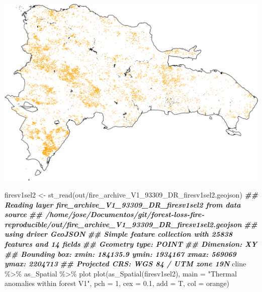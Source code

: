 \documentclass[10pt,landscape,a3paper]{article}
\newenvironment{Shaded}{\begin{snugshade}}{\end{snugshade}}
\newcommand{\AttributeTok}[1]{\textcolor[rgb]{0.77,0.63,0.00}{#1}}
\newcommand{\DecValTok}[1]{\textcolor[rgb]{0.00,0.00,0.81}{#1}}
\newcommand{\DocumentationTok}[1]{\textcolor[rgb]{0.56,0.35,0.01}{\textbf{\textit{#1}}}}
\newcommand{\FloatTok}[1]{\textcolor[rgb]{0.00,0.00,0.81}{#1}}
\newcommand{\FunctionTok}[1]{\textcolor[rgb]{0.00,0.00,0.00}{#1}}
\newcommand{\NormalTok}[1]{#1}
\newcommand{\OtherTok}[1]{\textcolor[rgb]{0.56,0.35,0.01}{#1}}
\newcommand{\SpecialCharTok}[1]{\textcolor[rgb]{0.00,0.00,0.00}{#1}}
\newcommand{\StringTok}[1]{\textcolor[rgb]{0.31,0.60,0.02}{#1}}
\begin{document}
\begin{center}\includegraphics{img/data-download-preparation-eda/fires-m6-v1-sel2-1} \end{center}

\begin{Shaded}
\begin{Highlighting}[]
\NormalTok{firesv1sel2 }\OtherTok{\textless{}{-}} \FunctionTok{st\_read}\NormalTok{(}\StringTok{\textquotesingle{}out/fire\_archive\_V1\_93309\_DR\_firesv1sel2.geojson\textquotesingle{}}\NormalTok{)}
\DocumentationTok{\#\# Reading layer \textasciigrave{}fire\_archive\_V1\_93309\_DR\_firesv1sel2\textquotesingle{} from data source }
\DocumentationTok{\#\#   \textasciigrave{}/home/jose/Documentos/git/forest{-}loss{-}fire{-}reproducible/out/fire\_archive\_V1\_93309\_DR\_firesv1sel2.geojson\textquotesingle{} }
\DocumentationTok{\#\#   using driver \textasciigrave{}GeoJSON\textquotesingle{}}
\DocumentationTok{\#\# Simple feature collection with 25838 features and 14 fields}
\DocumentationTok{\#\# Geometry type: POINT}
\DocumentationTok{\#\# Dimension:     XY}
\DocumentationTok{\#\# Bounding box:  xmin: 184135.9 ymin: 1934167 xmax: 569069 ymax: 2204713}
\DocumentationTok{\#\# Projected CRS: WGS 84 / UTM zone 19N}
\NormalTok{cline }\SpecialCharTok{\%\textgreater{}\%}\NormalTok{ as\_Spatial }\SpecialCharTok{\%\textgreater{}\%}\NormalTok{ plot}
\FunctionTok{plot}\NormalTok{(}\FunctionTok{as\_Spatial}\NormalTok{(firesv1sel2), }\AttributeTok{main =} \StringTok{"Thermal anomalies within forest V1"}\NormalTok{,}
     \AttributeTok{pch =} \DecValTok{1}\NormalTok{, }\AttributeTok{cex =} \FloatTok{0.1}\NormalTok{, }\AttributeTok{add =}\NormalTok{ T, }\AttributeTok{col =} \StringTok{\textquotesingle{}orange\textquotesingle{}}\NormalTok{)}
\end{Highlighting}
\end{Shaded}
\end{document}
